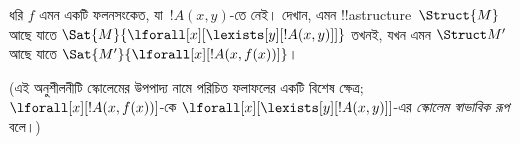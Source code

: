 \documentclass[../../../include/open-logic-section]{subfiles}
\begin{document}
\begin{prob}
ধরি $f$ এমন একটি ফলনসংকেত, যা~$!A(x,y)$-তে নেই। দেখান, এমন
!!a{structure}~$\Struct{M}$ আছে যাতে
$\Sat{M}{\lforall[x][\lexists[y][!A(x,y)]]}$ তখনই, যখন এমন
$\Struct M'$ আছে যাতে $\Sat{M'}{\lforall[x][!A(x,f(x))]}$।

(এই অনুশীলনীটি স্কোলেমের উপপাদ্য নামে পরিচিত ফলাফলের একটি বিশেষ ক্ষেত্র;
$\lforall[x][!A(x,f(x))]$-কে $\lforall[x][\lexists[y][!A(x,y)]]$-এর
\emph{স্কোলেম স্বাভাবিক রূপ} বলে।)
\end{prob}
\end{document}
